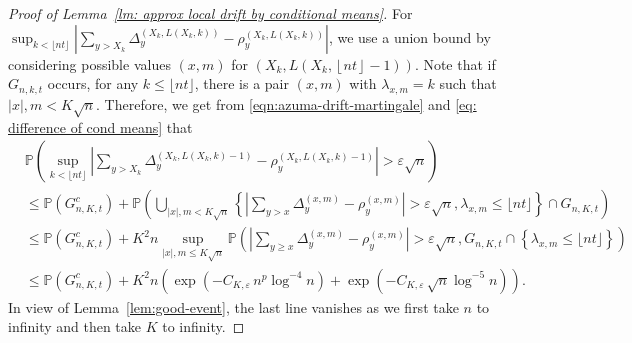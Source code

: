 \documentclass[twoside,12pt, a4paper, final]{article}
\numberwithin{equation}{section}
\theoremstyle{remark}
\newcommand{\abs}[1]{\left\vert #1 \right\vert}
\begin{document}
\begin{proof}[Proof of Lemma~\ref{lm: approx local drift by conditional means}]
	
	For $\sup_{k <\lfloor nt \rfloor} \left| \sum_{y > X_k} \Delta_y^{\left(X_k,L(X_k, k)\right)} - \rho_y^{\left(X_k,L(X_k, k)\right)} \right|$, we use a union bound by considering possible values $(x,m)$ for $\left(X_k, L\left(X_k, \left\lfloor nt  \right\rfloor - 1\right)\right)$. Note that if $G_{n,k,t}$ occurs, for any $k\leq \lfloor nt \rfloor$, there is a pair $(x,m)$ with $\lambda_{x,m}=k$ such that $\abs{x},m <K\sqrt{n}$. Therefore, we get from \eqref{eqn:azuma-drift-martingale} and \eqref{eq: difference of cond means} that 
	\begin{align*}
		& \mathbb{P}\left( \sup_{k <\lfloor nt \rfloor} \left| \sum_{y > X_k} 
		\Delta_y^{\left(X_k,L(X_k, k)-1\right)} - \rho_y^{\left(X_k,L(X_k, k)-1\right)}
		\right| > \varepsilon \sqrt{n}  \right) \\
		&\le \mathbb{P}(G_{n, K, t}^c) + \mathbb{P}\left( \bigcup_{|x|, m < K \sqrt{n} } \left\{  \left| \sum_{y > x} \Delta_y^{(x,m)} - \rho_y^{(x,m)} \right|  > \varepsilon \sqrt{n},  \lambda_{x,m} \leq\lfloor nt \rfloor \right\} \cap G_{n,K,t} \right) \\
		&\le \mathbb{P}(G_{n, K, t}^c) + K^2 n \sup _{|x|, m \le  K \sqrt{n} }
		\mathbb{P}\left( \left| \sum_{y \ge x} \Delta_y^{(x,m)} - \rho_y^{(x,m)} \right|  > \varepsilon \sqrt{n} , G_{n,K,t}\cap \left\{\lambda_{x,m} \leq\lfloor nt \rfloor \right\}  \right) \\
		&\le \mathbb{P}(G_{n, K, t}^c) + K^2 n \left( \exp\left( - C_{K, \varepsilon} \, n^{p } \log^{-4} n \right) + \exp\left( - C_{K, \varepsilon} \, \sqrt{n}  \log^{-5} n \right)\right) 
		.\end{align*}
	In view of Lemma~\ref{lem:good-event}, the last line vanishes as we first take $n$ to infinity and then take $K$ to infinity.
\end{proof}



\printbibliography
\end{document}
